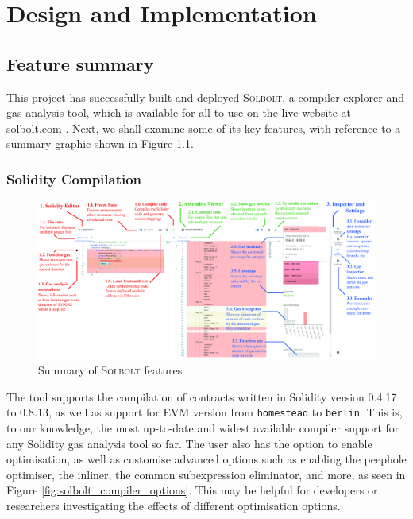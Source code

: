 \chapter{Design and Implementation}
\label{chap:implementation}


\section{Feature summary}
This project has successfully built and deployed \textcolor{NavyBlue}{\textsc{Solbolt}}, a compiler explorer and gas analysis tool,
which is available for all to use on the live website at \href{https://www.solbolt.com}{\textcolor{NavyBlue}{solbolt.com}} \cite{solbolt}. Next, we shall examine some of its
key features, with reference to a summary graphic shown in Figure \ref{fig:solbolt_summary}.

\subsection{Solidity Compilation}

\begin{figure}
  \centering
  \includegraphics[width=\textwidth]{./figures/implementation/summary}
  \caption{Summary of \textcolor{NavyBlue}{\textsc{Solbolt}} features}
  \label{fig:solbolt_summary}
\end{figure}

The tool supports the compilation of contracts written in Solidity version 0.4.17 to 0.8.13,
as well as support for EVM version from \texttt{homestead} to \texttt{berlin}. This is, to
our knowledge, the most up-to-date and widest available compiler support for any 
Solidity gas analysis tool so far. The user also has the option to enable optimisation, as
well as customise advanced options such as enabling the peephole optimiser, the inliner,
the common subexpression eliminator, and more, as seen in Figure \ref{fig:solbolt_compiler_options}. This may be helpful for developers or
researchers investigating the effects of different optimisation options.

